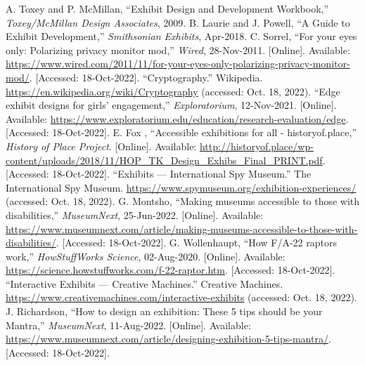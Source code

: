 \documentclass[conference]{IEEEtran}
\begin{document}
\onecolumn

\begin{thebibliography}{00}
    \normalsize
   A. Toxey and P. McMillan, “Exhibit Design and Development Workbook,” \textit{Toxey/McMillan Design Associates}, 2009. 
   B. Laurie and J. Powell, “A Guide to Exhibit Development,” \textit{Smithsonian Exhibits}, Apr-2018. 
   C. Sorrel, “For your eyes only: Polarizing privacy monitor mod,” \textit{Wired}, 28-Nov-2011. [Online]. Available: \href{https://www.wired.com/2011/11/for-your-eyes-only-polarizing-privacy-monitor-mod/}{https://www.wired.com/2011/11/for-your-eyes-only-polarizing-privacy-monitor-mod/}. [Accessed: 18-Oct-2022].
   “Cryptography.” Wikipedia. \href{https://en.wikipedia.org/wiki/Cryptography}{https://en.wikipedia.org/wiki/Cryptography}  (accessed: Oct. 18, 2022).
   “Edge exhibit designs for girls' engagement,” \textit{Exploratorium}, 12-Nov-2021. [Online]. Available: \href{https://www.exploratorium.edu/education/research-evaluation/edge}{https://www.exploratorium.edu/education/research-evaluation/edge}. [Accessed: 18-Oct-2022].
   E. Fox , “Accessible exhibitions for all - historyof.place,” \textit{History of Place Project}. [Online]. Available: \href{http://historyof.place/wp-content/uploads/2018/11/HOP\_TK\_Design\_Exhibs\_Final\_PRINT.pdf}{http://historyof.place/wp-content/uploads/2018/11/HOP\_TK\_Design\_Exhibs\_Final\_PRINT.pdf}. [Accessed: 18-Oct-2022].
   “Exhibits — International Spy Museum.” The International Spy Museum.  \href{https://www.spymuseum.org/exhibition-experiences/}{https://www.spymuseum.org/exhibition-experiences/}  (accessed: Oct. 18, 2022).
   G. Montsho, “Making museums accessible to those with disabilities,” \textit{MuseumNext}, 25-Jun-2022. [Online]. Available: \href{https://www.museumnext.com/article/making-museums-accessible-to-those-with-disabilities/}{https://www.museumnext.com/article/making-museums-accessible-to-those-with-disabilities/}. [Accessed: 18-Oct-2022].
   G. Wollenhaupt, “How F/A-22 raptors work,” \textit{HowStuffWorks Science}, 02-Aug-2020. [Online]. Available: \href{https://science.howstuffworks.com/f-22-raptor.htm}{https://science.howstuffworks.com/f-22-raptor.htm}. [Accessed: 18-Oct-2022]. 
 “Interactive Exhibits — Creative Machines.” Creative Machines.  \href{https://www.creativemachines.com/interactive-exhibits}{https://www.creativemachines.com/interactive-exhibits}  (accessed: Oct. 18, 2022).
 J. Richardson, “How to design an exhibition: These 5 tips should be your Mantra,” \textit{MuseumNext}, 11-Aug-2022. [Online]. Available: \href{https://www.museumnext.com/article/designing-exhibition-5-tips-mantra/}{https://www.museumnext.com/article/designing-exhibition-5-tips-mantra/}. [Accessed: 18-Oct-2022].

\end{thebibliography}
\end{document}
